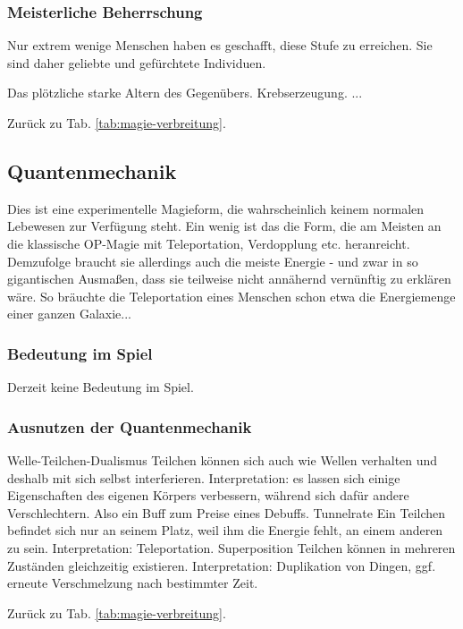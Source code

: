 \subsubsection{Meisterliche Beherrschung} 
Nur extrem wenige Menschen haben es geschafft, diese Stufe zu erreichen.
Sie sind daher geliebte und gefürchtete Individuen.
\begin{outline}
	\1 Das plötzliche starke Altern des Gegenübers.
	\1 Krebserzeugung.
	\1 ...
\end{outline}
Zurück zu Tab. \ref{tab:magie-verbreitung}.



\subsection{Quantenmechanik}\label{magie:quantenmechanik}
Dies ist eine experimentelle Magieform, die wahrscheinlich keinem normalen Lebewesen zur Verfügung steht.
Ein wenig ist das die Form, die am Meisten an die klassische OP-Magie mit Teleportation, Verdopplung etc. heranreicht.
Demzufolge braucht sie allerdings auch die meiste Energie - und zwar in so gigantischen Ausmaßen, dass sie teilweise nicht annähernd vernünftig zu erklären wäre.
So bräuchte die Teleportation eines Menschen schon etwa die Energiemenge einer ganzen Galaxie...

\subsubsection{Bedeutung im Spiel}
Derzeit keine Bedeutung im Spiel.

\subsubsection{Ausnutzen der Quantenmechanik}
\begin{outline}
	\1 Welle-Teilchen-Dualismus
		\2 Teilchen können sich auch wie Wellen verhalten und deshalb mit sich selbst interferieren.
		\2 Interpretation: es lassen sich einige Eigenschaften des eigenen Körpers verbessern, während sich dafür andere Verschlechtern.
		Also ein Buff zum Preise eines Debuffs.
	\1 Tunnelrate
		\2 Ein Teilchen befindet sich nur an seinem Platz, weil ihm die Energie fehlt, an einem anderen zu sein.
		\2 Interpretation: Teleportation.
	\1 Superposition
		\2 Teilchen können in mehreren Zuständen gleichzeitig existieren.
		\2 Interpretation: Duplikation von Dingen, ggf. erneute Verschmelzung nach bestimmter Zeit.
\end{outline}
Zurück zu Tab. \ref{tab:magie-verbreitung}.



